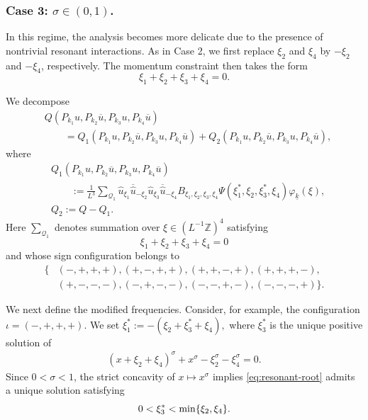 \documentclass[UTF-8,reqno]{amsart}
\numberwithin{equation}{section}
\theoremstyle{definition}
\def\min{{\mathord{{\rm min}}}}
\def\min{{\mathord{{\rm min}}}}
\begin{document}
\subsubsection{Case 3: $\sigma\in(0,1)$.}

In this regime, the analysis becomes more delicate due to the presence
of nontrivial resonant interactions. As in Case 2, we first replace
$\xi_2$ and $\xi_4$ by $-\xi_2$ and $-\xi_4$, respectively. The
momentum constraint then takes the form
\[
    \xi_1+\xi_2+\xi_3+\xi_4=0.
\]

We decompose
\begin{align*}
&Q(P_{k_1}u,P_{k_2}\overline u,
   P_{k_3}u,P_{k_4}\overline u)
\\
&\qquad
=
Q_1(P_{k_1}u,P_{k_2}\overline u,
    P_{k_3}u,P_{k_4}\overline u)
+
Q_2(P_{k_1}u,P_{k_2}\overline u,
    P_{k_3}u,P_{k_4}\overline u),
\end{align*}
where
\begin{align*}
&Q_1(P_{k_1}u,P_{k_2}\overline u,
     P_{k_3}u,P_{k_4}\overline u)
\\
&\qquad
:=
\frac{1}{L^3}
\sum_{\mathcal Q_1}
\widehat u_{\xi_1}
\overline{\widehat u}_{-\xi_2}
\widehat u_{\xi_3}
\overline{\widehat u}_{-\xi_4}
B_{\xi_1,\xi_2,\xi_3,\xi_4}
\Psi(\xi_1^*,\xi_2,\xi_3^*,\xi_4)
\varphi_{\underline k}(\xi),
\\
&Q_2:=Q-Q_1.
\end{align*}
Here $\sum_{\mathcal Q_1}$ denotes summation over
$\xi\in(L^{-1}\mathbb Z)^4$ satisfying
\[
    \xi_1+\xi_2+\xi_3+\xi_4=0
\]
and whose sign configuration belongs to
\begin{align*}
\{
&(-,+,+,+),(+,-,+,+),(+,+,-,+),(+,+,+,-),
\\
&(+,-,-,-),(-,+,-,-),(-,-,+,-),(-,-,-,+)
\}.
\end{align*}

We next define the modified frequencies. Consider, for example, the
configuration $\iota=(-,+,+,+).$ 
We set $ \xi_1^*
    :=
    -(\xi_2+\xi_3^*+\xi_4),$ 
where $\xi_3^*$ is the unique positive solution of
\begin{align}
    (x+\xi_2+\xi_4)^\sigma
    +x^\sigma
    -\xi_2^\sigma
    -\xi_4^\sigma
    =0.
\label{eq:resonant-root}
\end{align} 
Since $0<\sigma<1$, the strict concavity of $x\mapsto x^\sigma$
implies  \eqref{eq:resonant-root} admits a unique solution
satisfying
\[
    0<\xi_3^*<\min\{\xi_2,\xi_4\}.
\] 
  
\end{document}
